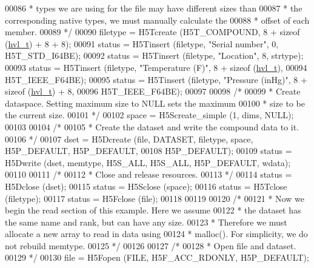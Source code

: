 \begin{DoxyCode}
00086 \textcolor{comment}{     * types we are using for the file may have different sizes than}
00087 \textcolor{comment}{     * the corresponding native types, we must manually calculate the}
00088 \textcolor{comment}{     * offset of each member.}
00089 \textcolor{comment}{     */}
00090     filetype = H5Tcreate (H5T\_COMPOUND, 8 + \textcolor{keyword}{sizeof} (\hyperlink{structhvl__t}{hvl\_t}) + 8 + 8);
00091     status = H5Tinsert (filetype, \textcolor{stringliteral}{"Serial number"}, 0, H5T\_STD\_I64BE);
00092     status = H5Tinsert (filetype, \textcolor{stringliteral}{"Location"}, 8, strtype);
00093     status = H5Tinsert (filetype, \textcolor{stringliteral}{"Temperature (F)"}, 8 + \textcolor{keyword}{sizeof} (\hyperlink{structhvl__t}{hvl\_t}),
00094                 H5T\_IEEE\_F64BE);
00095     status = H5Tinsert (filetype, \textcolor{stringliteral}{"Pressure (inHg)"}, 8 + \textcolor{keyword}{sizeof} (\hyperlink{structhvl__t}{hvl\_t}) + 8,
00096                 H5T\_IEEE\_F64BE);
00097 
00098     \textcolor{comment}{/*}
00099 \textcolor{comment}{     * Create dataspace.  Setting maximum size to NULL sets the maximum}
00100 \textcolor{comment}{     * size to be the current size.}
00101 \textcolor{comment}{     */}
00102     space = H5Screate\_simple (1, dims, NULL);
00103 
00104     \textcolor{comment}{/*}
00105 \textcolor{comment}{     * Create the dataset and write the compound data to it.}
00106 \textcolor{comment}{     */}
00107     dset = H5Dcreate (file, DATASET, filetype, space, H5P\_DEFAULT, H5P\_DEFAULT,
00108                 H5P\_DEFAULT);
00109     status = H5Dwrite (dset, memtype, H5S\_ALL, H5S\_ALL, H5P\_DEFAULT, wdata);
00110 
00111     \textcolor{comment}{/*}
00112 \textcolor{comment}{     * Close and release resources.}
00113 \textcolor{comment}{     */}
00114     status = H5Dclose (dset);
00115     status = H5Sclose (space);
00116     status = H5Tclose (filetype);
00117     status = H5Fclose (file);
00118 
00119 
00120     \textcolor{comment}{/*}
00121 \textcolor{comment}{     * Now we begin the read section of this example.  Here we assume}
00122 \textcolor{comment}{     * the dataset has the same name and rank, but can have any size.}
00123 \textcolor{comment}{     * Therefore we must allocate a new array to read in data using}
00124 \textcolor{comment}{     * malloc().  For simplicity, we do not rebuild memtype.}
00125 \textcolor{comment}{     */}
00126 
00127     \textcolor{comment}{/*}
00128 \textcolor{comment}{     * Open file and dataset.}
00129 \textcolor{comment}{     */}
00130     file = H5Fopen (FILE, H5F\_ACC\_RDONLY, H5P\_DEFAULT);

\end{DoxyCode}
